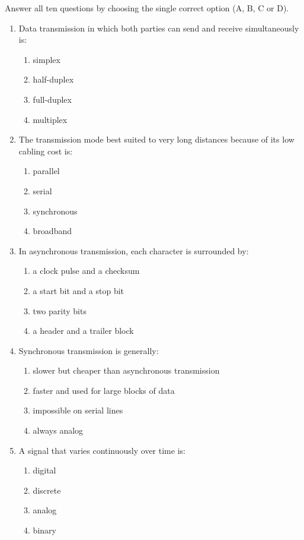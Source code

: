 \documentclass[11pt]{article}
\begin{document}
\begin{exercice}
Answer all ten questions by choosing the single correct option (A, B, C or D).
\begin{enumerate}
\item Data transmission in which both parties can send and receive simultaneously is:
\begin{enumerate}
\item simplex \item half-duplex \item full-duplex \item multiplex
\end{enumerate}
\item The transmission mode best suited to very long distances because of its low cabling cost is:
\begin{enumerate}
\item parallel \item serial \item synchronous \item broadband
\end{enumerate}
\item In asynchronous transmission, each character is surrounded by:
\begin{enumerate}
\item a clock pulse and a checksum
\item a start bit and a stop bit
\item two parity bits
\item a header and a trailer block
\end{enumerate}
\item Synchronous transmission is generally:
\begin{enumerate}
\item slower but cheaper than asynchronous transmission
\item faster and used for large blocks of data
\item impossible on serial lines
\item always analog
\end{enumerate}
\item A signal that varies continuously over time is:
\begin{enumerate}
\item digital \item discrete \item analog \item binary
\end{enumerate}

\end{enumerate}
\end{exercice}
\end{document}
